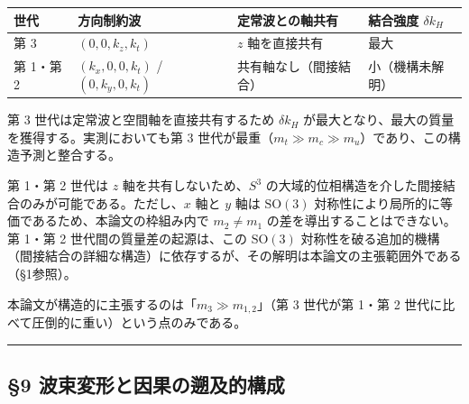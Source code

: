 \documentclass[
  a4paper,11pt]{ltjsarticle}
\newcounter{none}
\theoremstyle{definition}
\theoremstyle{remark}
\begin{document}
{\def\LTcaptype{none} %
\begin{longtable}[]{@{}
  >{\raggedright\arraybackslash}p{}
  >{\raggedright\arraybackslash}p{}
  >{\raggedright\arraybackslash}p{}
  >{\raggedright\arraybackslash}p{}@{}}
\toprule\noalign{}
\begin{minipage}[b]{\linewidth}\raggedright
世代
\end{minipage} & \begin{minipage}[b]{\linewidth}\raggedright
方向制約波
\end{minipage} & \begin{minipage}[b]{\linewidth}\raggedright
定常波との軸共有
\end{minipage} & \begin{minipage}[b]{\linewidth}\raggedright
結合強度 \(\delta k_H\)
\end{minipage} \\
\midrule\noalign{}
\endhead
\bottomrule\noalign{}
\endlastfoot
第 3 & \((0, 0, k_z, k_t)\) & \(z\) 軸を直接共有 & 最大 \\
第 1・第 2 & \((k_x, 0, 0, k_t)\) / \((0, k_y, 0, k_t)\) &
共有軸なし（間接結合） & 小（機構未解明） \\
\end{longtable}
}

第 3 世代は定常波と空間軸を直接共有するため \(\delta k_H\)
が最大となり、最大の質量を獲得する。実測においても第 3
世代が最重（\(m_t \gg m_c \gg m_u\)）であり、この構造予測と整合する。

第 1・第 2 世代は \(z\) 軸を共有しないため、\(S^3\)
の大域的位相構造を介した間接結合のみが可能である。ただし、\(x\) 軸と
\(y\) 軸は \(\mathrm{SO}(3)\)
対称性により局所的に等価であるため、本論文の枠組み内で \(m_2 \neq m_1\)
の差を導出することはできない。第 1・第 2 世代間の質量差の起源は、この
\(\mathrm{SO}(3)\)
対称性を破る追加的機構（間接結合の詳細な構造）に依存するが、その解明は本論文の主張範囲外である（§1参照）。

本論文が構造的に主張するのは「\(m_3 \gg m_{1,2}\)」（第 3 世代が第 1・第
2 世代に比べて圧倒的に重い）という点のみである。

\begin{center}\rule{0.5\linewidth}{0.5pt}\end{center}

\subsection{§9
波束変形と因果の遡及的構成}\label{ux6ce2ux675fux5909ux5f62ux3068ux56e0ux679cux306eux9061ux53caux7684ux69cbux6210}
\end{document}
